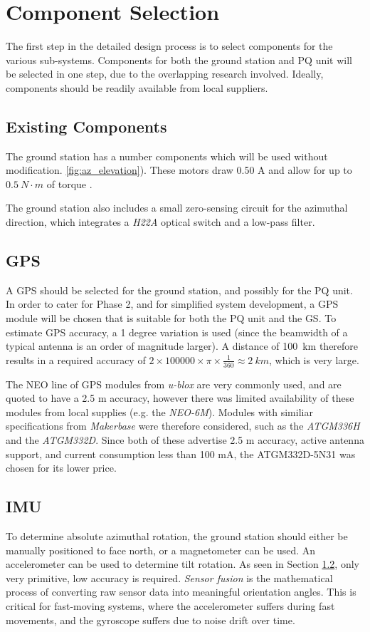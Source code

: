 \graphicspath{{./figures}}

\section{Component Selection}
The first step in the detailed design process is to select components for the various sub-systems. Components for both the ground station and PQ unit will be selected in one step, due to the overlapping research involved. Ideally, components should be readily available from local suppliers.

\subsection{Existing Components}
The ground station has a number components which will be used without modification.  \ref{fig:az_elevation}). These motors draw 0.50 A and allow for up to $\SI{0.5}{N \cdot m}$ of torque \cite{datasheet-4118}.

The ground station also includes a small zero-sensing circuit for the azimuthal direction, which integrates a \textit{H22A} optical switch \cite{datasheet-H22A1} and a low-pass filter.

\subsection{GPS}\label{sec:components_gps}
A GPS should be selected for the ground station, and possibly for the PQ unit. In order to cater for Phase 2, and for simplified system development, a GPS module will be chosen that is suitable for both the PQ unit and the GS. To estimate GPS accuracy, a 1 degree variation is used (since the beamwidth of a typical antenna is an order of magnitude larger). A distance of \SI{100}{km} therefore results in a required accuracy of $2 \times 100 000 \times \pi \times \frac{1}{360} \approx \SI{2}{km}$, which is very large.

The NEO line of GPS modules from \textit{u-blox} are very commonly used, and are quoted to have a 2.5 m accuracy, however there was limited availability of these modules from local supplies (e.g. the \textit{NEO-6M}). Modules with similiar specifications from \textit{Makerbase} were therefore considered, such as the \textit{ATGM336H} and the \textit{ATGM332D}. Since both of these advertise 2.5 m accuracy, active antenna support, and current consumption less than 100 mA, the ATGM332D-5N31 was chosen for its lower price.

\subsection{IMU}
To determine absolute azimuthal rotation, the ground station should either be manually positioned to face north, or a magnetometer can be used. An accelerometer can be used to determine tilt rotation. As seen in Section \ref{sec:components_gps}, only very primitive, low accuracy is required. \textit{Sensor fusion} is the mathematical process of converting raw sensor data into meaningful orientation angles. This is critical for fast-moving systems, where the accelerometer suffers during fast movements, and the gyroscope suffers due to noise drift over time.

